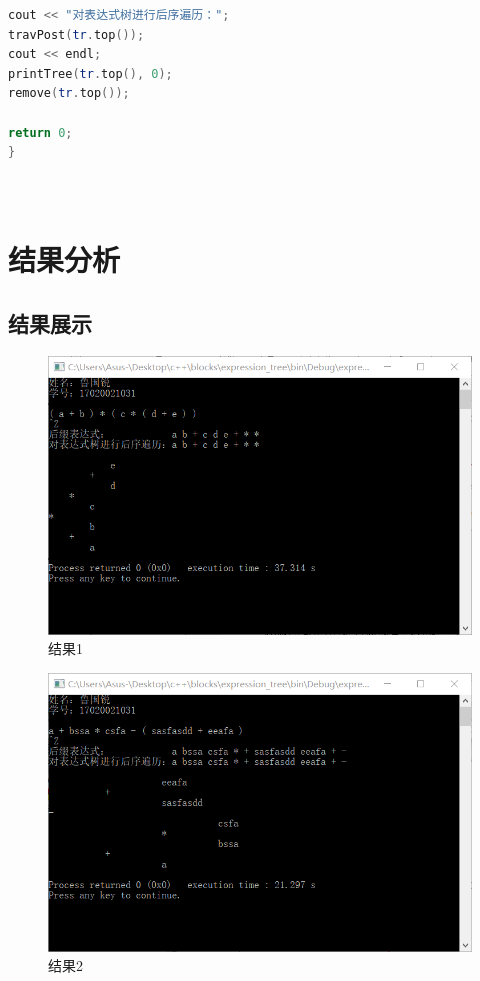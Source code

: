 \documentclass[UTF8]{ctexart}
\begin{document}
\begin{lstlisting}[language=C++,caption={expression\_tree代码},label={expression_tree_code}]
cout << "对表达式树进行后序遍历：";
travPost(tr.top());
cout << endl;
printTree(tr.top(), 0);
remove(tr.top());

return 0;
}




	\end{lstlisting}

	\section{结果分析}
	\subsection{结果展示}

\begin{figure}[H]
	\centering 
	\includegraphics[scale=0.8]{res1.png} 
	\caption{结果1} 
	\label{res1}
\end{figure}



\begin{figure}[H]
	\centering 
	\includegraphics[scale=0.8]{res3.png} 
	\caption{结果2} 
	\label{res2}
\end{figure}
\end{document}
